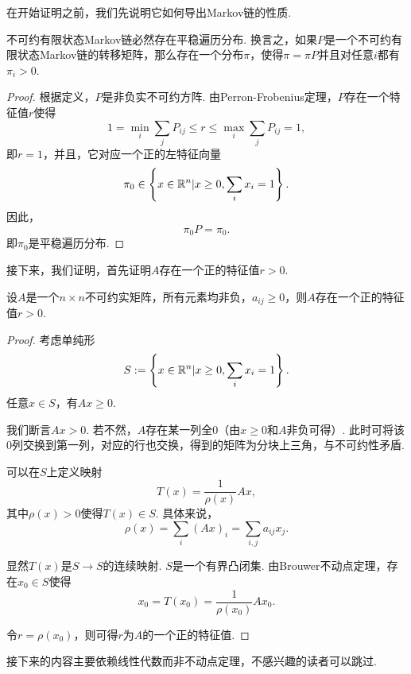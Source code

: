 在开始证明之前，我们先说明它如何导出Markov链的性质. 

\begin{corollary}
    不可约有限状态Markov链必然存在平稳遍历分布. 换言之，如果$P$是一个不可约有限状态Markov链的转移矩阵，那么存在一个分布$\pi$，使得$\pi=\pi P$并且对任意$i$都有$\pi_{i}>0$.
\end{corollary}
\begin{proof}
    根据定义，$P$是非负实不可约方阵. 由Perron-Frobenius定理，$P$存在一个特征值$r$使得
    \[1=\min_i\sum_jP_{ij}\leq r\le\max_i\sum_j P_{ij}=1,\]
    即$r=1$，并且，它对应一个正的左特征向量
    \[\pi_0\in \left\{x\in\mathbb{R}^n|x\geq 0,\sum_ix_i=1\right\}.\]
    因此，
    \[\pi_0 P = \pi_0.\]
    即$\pi_0$是平稳遍历分布. 
\end{proof}

接下来，我们证明，首先证明$A$存在一个正的特征值$r>0$.

\begin{lemma}\label{lemma:positive-eigenvalue}
    设$A$是一个$n\times n$不可约实矩阵，所有元素均非负，$a_{ij}\geq 0$，则$A$存在一个正的特征值$r>0$.
\end{lemma}
\begin{proof}
考虑单纯形
\[S:=\left\{x\in\mathbb{R}^n|x\geq 0,\sum_i x_i=1\right\}.\]
任意$x\in S$，有$Ax\geq 0$. 

我们断言$Ax>0$. 若不然，$A$存在某一列全$0$（由$x\geq 0$和$A$非负可得）. 此时可将该$0$列交换到第一列，对应的行也交换，得到的矩阵为分块上三角，与不可约性矛盾.

可以在$S$上定义映射
\[T(x) = \frac1{\rho(x)}Ax,\]
其中$\rho(x) > 0$使得$T(x)\in S$. 具体来说，
\[\rho(x) = \sum_i (Ax)_i = \sum_{i,j} a_{ij}x_j.\]

显然$T(x)$是$S\to S$的连续映射. $S$是一个有界凸闭集. 由Brouwer不动点定理，存在$x_0\in S$使得
\[x_0 = T(x_0)=\frac1{\rho(x_0)}Ax_0.\]

令$r=\rho(x_0)$，则可得$r$为$A$的一个正的特征值.
\end{proof}

接下来的内容主要依赖线性代数而非不动点定理，不感兴趣的读者可以跳过.

